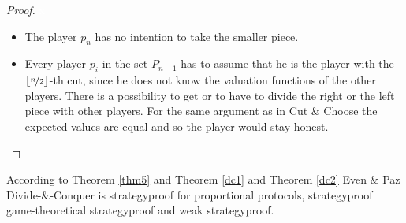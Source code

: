 \begin{proof}
\textcolor{white}{x}
\begin{itemize}
\item The player $p_n$ has no intention to take the smaller piece.\\
\item Every player $p_i$ in the set $P_{n-1}$ has to assume that he is the player with the $\lfloor\nicefrac{n}{2}\rfloor$-th cut, since he does not know the valuation functions of the other players. There is a possibility to get or to have to divide the right or the left piece with other players. For the same argument as in Cut $\&$ Choose the expected values are equal and so the player would stay honest.
\end{itemize}
\end{proof}

\begin{bezeichnungen}
According to Theorem \ref{thm5} and Theorem \ref{dc1} and Theorem \ref{dc2} 
Even $\&$ Paz Divide-$\&$-Conquer is strategyproof for proportional protocols, strategyproof game-theoretical strategyproof and weak strategyproof.
\end{bezeichnungen}
\newpage

